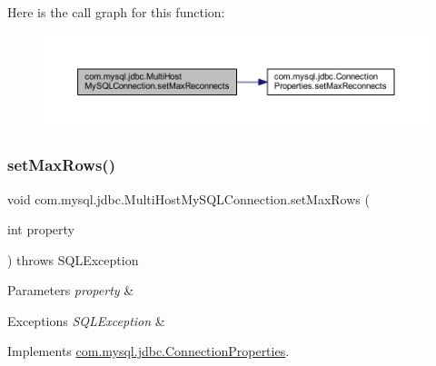 Here is the call graph for this function\+:
\nopagebreak
\begin{figure}[H]
\begin{center}
\leavevmode
\includegraphics[width=350pt]{classcom_1_1mysql_1_1jdbc_1_1_multi_host_my_s_q_l_connection_a3f763d84919c40ae00d9d76bc53ac78e_cgraph}
\end{center}
\end{figure}
\mbox{\label{classcom_1_1mysql_1_1jdbc_1_1_multi_host_my_s_q_l_connection_a15920ec9b291f698817ea82c8ecabfbe}} 
\subsubsection{\texorpdfstring{set\+Max\+Rows()}{setMaxRows()}}
{\footnotesize\ttfamily void com.\+mysql.\+jdbc.\+Multi\+Host\+My\+S\+Q\+L\+Connection.\+set\+Max\+Rows (\begin{DoxyParamCaption}\item[{int}]{property }\end{DoxyParamCaption}) throws S\+Q\+L\+Exception}


\begin{DoxyParams}{Parameters}
{\em property} & \\
\hline
\end{DoxyParams}

\begin{DoxyExceptions}{Exceptions}
{\em S\+Q\+L\+Exception} & \\
\hline
\end{DoxyExceptions}


Implements \mbox{\hyperlink{interfacecom_1_1mysql_1_1jdbc_1_1_connection_properties_afbeac8befbc0374361e27aa4fead424a}{com.\+mysql.\+jdbc.\+Connection\+Properties}}.


